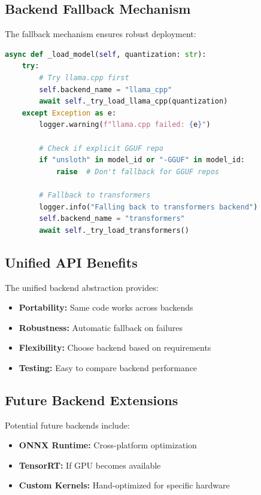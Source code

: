 \subsection{Backend Fallback Mechanism}

The fallback mechanism ensures robust deployment:

\begin{lstlisting}[language=Python, caption=Backend Fallback]
async def _load_model(self, quantization: str):
    try:
        # Try llama.cpp first
        self.backend_name = "llama_cpp"
        await self._try_load_llama_cpp(quantization)
    except Exception as e:
        logger.warning(f"llama.cpp failed: {e}")
        
        # Check if explicit GGUF repo
        if "unsloth" in model_id or "-GGUF" in model_id:
            raise  # Don't fallback for GGUF repos
        
        # Fallback to transformers
        logger.info("Falling back to transformers backend")
        self.backend_name = "transformers"
        await self._try_load_transformers()
\end{lstlisting}

\subsection{Unified API Benefits}

The unified backend abstraction provides:

\begin{itemize}
    \item \textbf{Portability:} Same code works across backends
    \item \textbf{Robustness:} Automatic fallback on failures
    \item \textbf{Flexibility:} Choose backend based on requirements
    \item \textbf{Testing:} Easy to compare backend performance
\end{itemize}

\subsection{Future Backend Extensions}

Potential future backends include:

\begin{itemize}
    \item \textbf{ONNX Runtime:} Cross-platform optimization
    \item \textbf{TensorRT:} If GPU becomes available
    \item \textbf{Custom Kernels:} Hand-optimized for specific hardware
\end{itemize}
